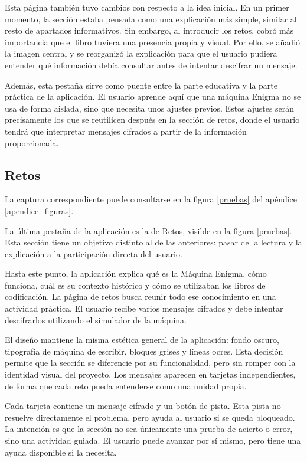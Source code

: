 Esta página también tuvo cambios con respecto a la idea inicial. En un primer momento, la sección estaba pensada como una explicación más simple, similar al resto de apartados informativos. Sin embargo, al introducir los retos, cobró más importancia que el libro tuviera una presencia propia y visual. Por ello, se añadió la imagen central y se reorganizó la explicación para que el usuario pudiera entender qué información debía consultar antes de intentar descifrar un mensaje.

Además, esta pestaña sirve como puente entre la parte educativa y la parte práctica de la aplicación. El usuario aprende aquí que una máquina Enigma no se usa de forma aislada, sino que necesita unos ajustes previos. Estos ajustes serán precisamente los que se reutilicen después en la sección de retos, donde el usuario tendrá que interpretar mensajes cifrados a partir de la información proporcionada.

\subsection{Retos}

La captura correspondiente puede consultarse en la figura \ref{pruebas} del apéndice \ref{apendice_figuras}.

La última pestaña de la aplicación es la de Retos, visible en la figura \ref{pruebas}. Esta sección tiene un objetivo distinto al de las anteriores: pasar de la lectura y la explicación a la participación directa del usuario.

Hasta este punto, la aplicación explica qué es la Máquina Enigma, cómo funciona, cuál es su contexto histórico y cómo se utilizaban los libros de codificación. La página de retos busca reunir todo ese conocimiento en una actividad práctica. El usuario recibe varios mensajes cifrados y debe intentar descifrarlos utilizando el simulador de la máquina.

El diseño mantiene la misma estética general de la aplicación: fondo oscuro, tipografía de máquina de escribir, bloques grises y líneas ocres. Esta decisión permite que la sección se diferencie por su funcionalidad, pero sin romper con la identidad visual del proyecto. Los mensajes aparecen en tarjetas independientes, de forma que cada reto pueda entenderse como una unidad propia.

Cada tarjeta contiene un mensaje cifrado y un botón de pista. Esta pista no resuelve directamente el problema, pero ayuda al usuario si se queda bloqueado. La intención es que la sección no sea únicamente una prueba de acierto o error, sino una actividad guiada. El usuario puede avanzar por sí mismo, pero tiene una ayuda disponible si la necesita.

